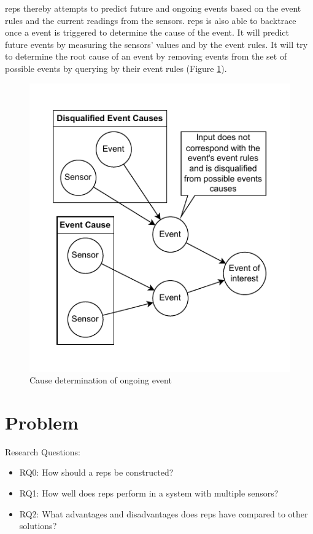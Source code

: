 \documentclass[a4paper,8pt]{article}
\begin{document}
		\gls{reps} thereby attempts to predict future and ongoing events based on the event rules and the current readings from the sensors. \gls{reps} is also able to backtrace once a event is triggered to determine the cause of the event. It will predict future events by measuring the sensors' values and by the event rules. It will try to determine the root cause of an event by removing events from the set of possible events by querying by their event rules (Figure \ref{fig:EventRuleBroken}).
		\begin{figure}[!h]
			\centering
			\includegraphics[width=.7\textwidth]{EventRuleBroken}
			\caption{Cause determination of ongoing event}
			\label{fig:EventRuleBroken}
		\end{figure}
		
	\section{Problem}
		Research Questions:
		\begin{itemize}
			\item RQ0: How should a \gls{reps} be constructed?
			\item RQ1: How well does \gls{reps} perform in a system with multiple sensors?
			\item RQ2: What advantages and disadvantages does \gls{reps} have compared to other solutions?
		\end{itemize}
	\newpage
\end{document}
